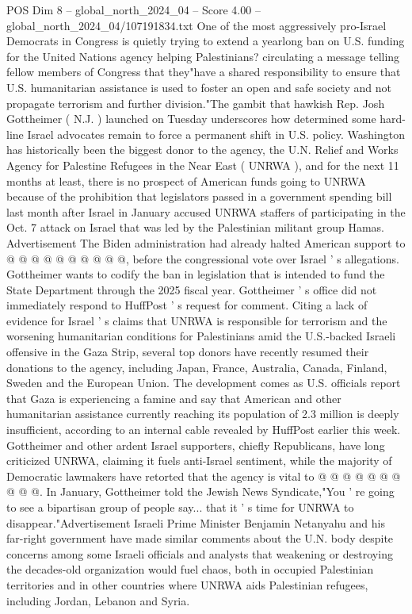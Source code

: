 \begin{textsample}{POS Dim 8 – global\_north\_2024\_04 – Score 4.00 – global\_north\_2024\_04/107191834.txt}  \label{ex:f8_pos_318}
One of the most aggressively pro-Israel Democrats in Congress is quietly trying to extend a yearlong ban on U.S. funding for the United Nations agency helping Palestinians? circulating a message telling fellow members of Congress that they"have a shared responsibility to ensure that U.S. humanitarian assistance is used to foster an open and safe society and not propagate terrorism and further division."The gambit that hawkish Rep.
Josh Gottheimer ( N.J. ) launched on Tuesday underscores how determined some hard-line Israel advocates remain to force a permanent shift in U.S. policy.
Washington has historically been the biggest donor to the agency, the U.N.
Relief and Works Agency for Palestine Refugees in the Near East ( UNRWA ), and for the next 11 months at least, there is no prospect of American funds going to UNRWA because of the prohibition that legislators passed in a government spending bill last month after Israel in January accused UNRWA staffers of participating in the Oct. 7 attack on Israel that was led by the Palestinian militant group Hamas.
Advertisement The Biden administration had already halted American support to @ @ @ @ @ @ @ @ @ @, before the congressional vote over Israel ' s allegations.
Gottheimer wants to codify the ban in legislation that is intended to fund the State Department through the 2025 fiscal year.
Gottheimer ' s office did not immediately respond to HuffPost ' s request for comment.
Citing a lack of evidence for Israel ' s claims that UNRWA is responsible for terrorism and the worsening humanitarian conditions for Palestinians amid the U.S.-backed Israeli offensive in the Gaza Strip, several top donors have recently resumed their donations to the agency, including Japan, France, Australia, Canada, Finland, Sweden and the European Union.
The development comes as U.S. officials report that Gaza is experiencing a famine and say that American and other humanitarian assistance currently reaching its population of 2.3 million is deeply insufficient, according to an internal cable revealed by HuffPost earlier this week.
Gottheimer and other ardent Israel supporters, chiefly Republicans, have long criticized UNRWA, claiming it fuels anti-Israel sentiment, while the majority of Democratic lawmakers have retorted that the agency is vital to @ @ @ @ @ @ @ @ @ @.
In January, Gottheimer told the Jewish News Syndicate,"You ' re going to see a bipartisan group of people say... that it ' s time for UNRWA to disappear."Advertisement Israeli Prime Minister Benjamin Netanyahu and his far-right government have made similar comments about the U.N. body despite concerns among some Israeli officials and analysts that weakening or destroying the decades-old organization would fuel chaos, both in occupied Palestinian territories and in other countries where UNRWA aids Palestinian refugees, including Jordan, Lebanon and Syria.

\end{textsample}
